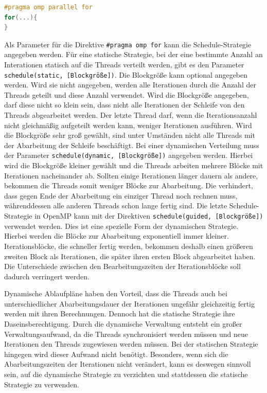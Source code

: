 \documentclass[../main.tex]{subfiles}
\begin{document}
\begin{lstlisting}[language=c++, caption=Kurzschreibweise einer parallelen For-Schleife, captionpos=b, label=listing:parallel_for, frame=single, linewidth=\textwidth, breaklines=true]
#pragma omp parallel for
for(...){
}
\end{lstlisting}

Als Parameter für die Direktive \texttt{\#pragma omp for} kann die Schedule-Strategie angegeben werden. Für eine statische Strategie, bei der eine bestimmte Anzahl an Interationen statisch auf die Threads verteilt werden, gibt es den Parameter \texttt{schedule(static, [Blockgröße])}. Die Blockgröße kann optional angegeben werden. Wird sie nicht angegeben, werden alle Iterationen durch die Anzahl der Threads geteilt und diese Anzahl verwendet. Wird die Blockgröße angegeben, darf diese nicht so klein sein, dass nicht alle Iterationen der Schleife von den Threads abgearbeitet werden. Der letzte Thread darf, wenn die Iterationsanzahl nicht gleichmäßig aufgeteilt werden kann, weniger Iterationen ausführen. Wird die Blockgröße sehr groß gewählt, sind unter Umständen nicht alle Threads mit der Abarbeitung der Schleife beschäftigt.
Bei einer dynamischen Verteilung muss der Parameter \texttt{schedule(dynamic, [Blockgröße])} angegeben werden. Hierbei wird die Blockgröße kleiner gewählt und die Threads arbeiten mehrere Blöcke mit Iterationen nacheinander ab. Sollten einige Iterationen länger dauern als andere, bekommen die Threads somit weniger Blöcke zur Abarbeitung. Die verhindert, dass gegen Ende der Abarbeitung ein einziger Thread noch rechnen muss, währenddessen alle anderen Threads schon lange fertig sind.
Die letzte Schedule-Strategie in OpenMP kann mit der Direktiven \texttt{schedule(guided, [Blockgröße])} verwendet werden. Dies ist eine spezielle Form der dynamischen Strategie. Hierbei werden die Blöcke zur Abarbeitung exponentiell immer kleiner. Iterationsblöcke, die schneller fertig werden, bekommen deshalb einen größeren zweiten Block als Iterationen, die später ihren ersten Block abgearbeitet haben. Die Unterschiede zwischen den Bearbeitungszeiten der Iterationsblöcke soll dadurch verringert werden.

Dynamische Ablaufpläne haben den Vorteil, dass die Threads auch bei unterschiedlicher Abarbeitungsdauer der Iterationen ungefähr gleichzeitig fertig werden mit ihren Berechnungen. Dennoch hat die statische Strategie ihre Daseinsberechtigung. Durch die dynamische Verwaltung entsteht ein großer Verwaltungsaufwand, da die Threads synchronisiert werden müssen und neue Iterationen den Threads zugewiesen werden müssen. Bei der statischen Strategie hingegen wird dieser Aufwand nicht benötigt. Besonders, wenn sich die Abarbeitungszeiten der Iterationen nicht verändert, kann es deswegen sinnvoll sein, auf die dynamische Strategie zu verzichten und stattdessen die statische Strategie zu verwenden.
\end{document}
